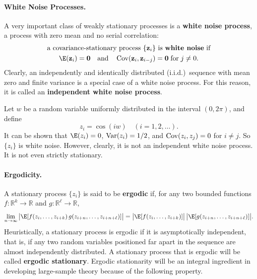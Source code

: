 \paragraph{White Noise Processes.}
A very important class of weakly stationary processes is a \textbf{white noise process},
a process with zero mean and no serial correlation:
\begin{gather*}
  \text{a covariance-stationary process $\{\mathbf{z}_i\}$ is \textbf{white noise} if}
  \\
  \E(\mathbf{z}_i) = \mathbf{0} \quad \text{and} \quad
  \Cov(\mathbf{z}_i, \mathbf{z}_{i-j}) = \mathbf{0} \;\text{for}\; j \neq 0.
\end{gather*}
Clearly, an independently and identically distributed (i.i.d.)\ sequence with mean
zero and finite variance is a special case of a white noise process.  For this reason,
it is called an \textbf{independent white noise process}.

\begin{example}
\label{ex:2.4}
Let $w$ be a random variable uniformly distributed in the interval $(0, 2\pi)$,
and define
\[
  z_i = \cos(iw) \quad (i = 1, 2, \ldots).
\]
It can be shown that $\E(z_i) = 0$, $\operatorname{Var}(z_i) = 1/2$, and
$\operatorname{Cov}(z_i, z_j) = 0$ for $i \neq j$.  So $\{z_i\}$ is white noise.  However,
clearly, it is not an independent white noise process.  It is not even strictly
stationary.
\end{example}

\paragraph{Ergodicity.}
A stationary process $\{z_i\}$ is said to be \textbf{ergodic} if, for any two bounded
functions $f\colon \mathbb{R}^k \to \mathbb{R}$ and
$g\colon \mathbb{R}^\ell \to \mathbb{R}$,
\[
  \lim_{n \to \infty}
  \big|\E[f(z_i, \ldots, z_{i+k})\,g(z_{i+n}, \ldots, z_{i+n+\ell})]\big|
  = \big|\E[f(z_i, \ldots, z_{i+k})]\big|\,
    \big|\E[g(z_{i+n}, \ldots, z_{i+n+\ell})]\big|.
\]
Heuristically, a stationary process is ergodic if it is asymptotically independent,
that is, if any two random variables positioned far apart in the sequence are almost
independently distributed.  A stationary process that is ergodic will be called
\textbf{ergodic stationary}.  Ergodic stationarity will be an integral ingredient in
developing large-sample theory because of the following property.

